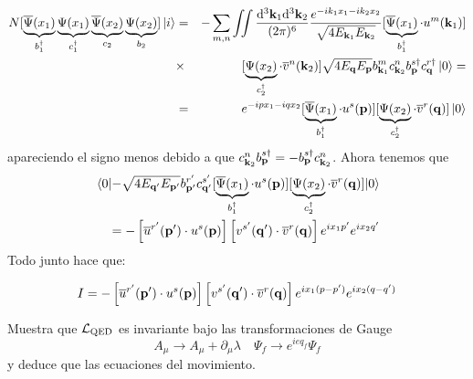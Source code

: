 \begin{solucion}
\begin{itemize}
		\begin{eqnarray*}			
			N[\underbrace{ \overline{\Psi} (x_1)}_{b^\dagger_1}\underbrace{ \Psi (x_1)}_{c^\dagger_1}  \underbrace{ \overline{\Psi} 	(x_2)}_{c_2} \underbrace{ \Psi (x_2)}_{b_2}] \ket{i} & = & -\sum_{m,n} \iint \frac{\mathrm{d}^3 \mathbf{k}_1 \mathrm{d}^3 \mathbf{k}_2}{(2\pi)^6} \frac{e^{-i k_1 x_1 - i k_2 x_2}}{\sqrt{4E_{\mathbf{k}_1}E_{\mathbf{k}_2}}} [\underbrace{ \overline{\Psi} (x_1)}_{b^\dagger_1} \cdot u^m(\mathbf{k}_1)]  \\ & \times & [\underbrace{ \Psi (x_2)}_{c^\dagger_2} \cdot \overline{v}^n(\mathbf{k}_2)] \sqrt{4E_{\mathbf{q}} E_{\mathbf{p}}} b_{\mathbf{k}_1}^m c_{\mathbf{k}_2}^n b_{\mathbf{p}}^{s\dagger} c_ {\mathbf{q}}^{r \dagger}  \ket{0} =  \\
			& = &  e^{-i p x_1 - i q x_2} [\underbrace{ \overline{\Psi} (x_1)}_{b^\dagger_1} \cdot u^s(\mathbf{p})]  [\underbrace{ \Psi (x_2)}_{c^\dagger_2} \cdot \overline{v}^r(\mathbf{q})]  \ket{0}  
		\end{eqnarray*}
		apareciendo el signo menos debido a que $c_{\mathbf{k}_2}^n b_{\mathbf{p}}^{s\dagger}=- b_{\mathbf{p}}^{s\dagger}c_{\mathbf{k}_2}^n$. Ahora tenemos que 
		\begin{eqnarray*}
			\mel{0}{ -\sqrt{4E_{\mathbf{q}'} E_{\mathbf{p}'}} b_{\mathbf{p}'}^{r'} c_{\mathbf{q}'}^{s'} [\underbrace{ \overline{\Psi}(x_1)}_{b^\dagger_1} \cdot u^s(\mathbf{p})] [\underbrace{ \Psi (x_2)}_{c^\dagger_2} \cdot \overline{v}^r(\mathbf{q})] }{0} \\ =- \left[ \overline{u}^{r'}(\mathbf{p}') \cdot u^{s}(\mathbf{p}) \right] \left[ v^{s'}(\mathbf{q}') \cdot \overline{v}^{r}(\mathbf{q}) \right] e^{ix_1  p'} e^{ix_2 q'}
		\end{eqnarray*}
		Todo junto hace que:
		
		\begin{equation}
			I = - \left[ \overline{u}^{r'}(\mathbf{p}') \cdot u^{s}(\mathbf{p}) \right] \left[ v^{s'}(\mathbf{q}') \cdot \overline{v}^{r}(\mathbf{q}) \right]e^{ix_1(p-p')}e^{ix_2(q-q')}
		\end{equation}
	\end{itemize}
	
\end{solucion}



\begin{ejercicio} 
	Muestra que $\mathcal{L}_{\text{QED}}$ es invariante bajo las transformaciones de Gauge  
	\begin{equation*}
		A_\mu \rightarrow A_\mu + \partial_\mu \lambda \quad \Psi_f \rightarrow e^{ieq_f}\Psi_f
	\end{equation*}
	y deduce que las ecuaciones del movimiento.
	
\end{ejercicio}



